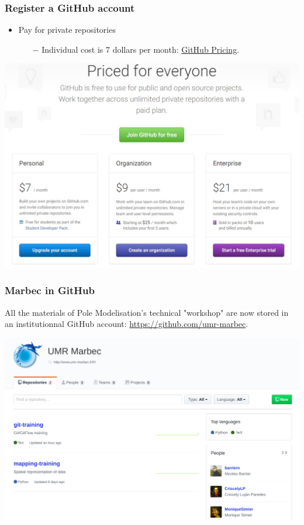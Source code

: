 \documentclass[svgnames]{beamer}
\begin{document}
\begin{frame}
\frametitle{Register a GitHub account}
\begin{itemize}
    \item Pay for private repositories
    \begin{itemize}
    \item[$-$] Individual cost is 7 dollars per month: \href{https://github.com/pricing}{ GitHub Pricing}.
    \end{itemize}

\end{itemize}

\begin{center}
\includegraphics[scale=0.35]{img/github_pricing.jpg}
\end{center}  
\end{frame}

\begin{frame}
\frametitle{Marbec in GitHub}

    All the materials of Pole Modelisation's technical "workshop" are now stored in an institutionnal GitHub account: \url{https://github.com/umr-marbec}.

\begin{center}
\includegraphics[scale=0.2]{img/github_marbec.png}
\end{center}  
\end{frame}
\end{document}
